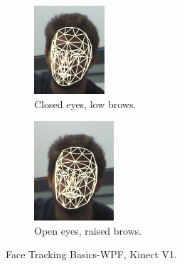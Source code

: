 \begin{figure}[H]
\begin{subfigure}{.3\textwidth}
		\includegraphics[width=0.8\linewidth]{sections/analysis/sensorselection/kinect/poly_closed_eyes}
		\caption{Closed eyes, low brows.}\label{[KINECT][WIREFRAME] Closed eyes, low brows}
	\end{subfigure}\hfill%
	\begin{subfigure}{.3\textwidth}
		\centering
		\includegraphics[width=0.8\linewidth]{sections/analysis/sensorselection/kinect/poly_brows_high}
		\caption{Open eyes, raised brows.}\label{[KINECT][WIREFRAME] Open eyes, raised brows}
	\end{subfigure}
	\caption{Face Tracking Basics-WPF, Kinect V1.}
	\label{[KINECT][WIREFRAME] Wireframe captures.}
\end{figure}